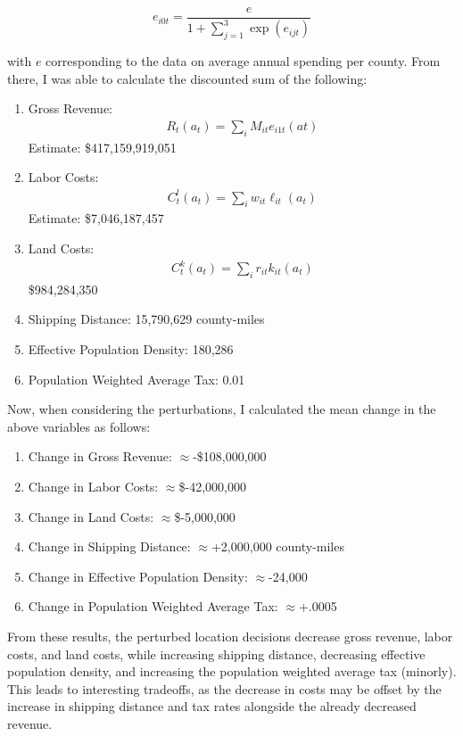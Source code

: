 \documentclass[11pt]{article}
\theoremstyle{definition}
\theoremstyle{remark}
\begin{document}
\begin{equation}
  e_{i0t} = \frac{e}{1 + \sum_{j=1}^3 \exp(e_{ijt})}
\end{equation}

with $e$ corresponding to the data on average annual spending per county. From there, I was able to calculate the discounted sum of the following:

\begin{enumerate}
  \item Gross Revenue: 
  \begin{gather*}
    R_t(a_t) = \sum_iM_{it}e_{i1t}(at)
  \end{gather*}
  Estimate: \$417,159,919,051
  \item Labor Costs:
  \begin{gather*}
    C^l_t(a_t) = \sum_iw_{it}\ell_{it}(a_t)
  \end{gather*}
  Estimate: \$7,046,187,457
  \item Land Costs:
  \begin{gather*}
    C^k_t(a_t) = \sum_i r_{it} k_{it}(a_t)
  \end{gather*}
  \$984,284,350
  \item Shipping Distance: 15,790,629 county-miles
  \item Effective Population Density: 180,286 
  \item Population Weighted Average Tax: 0.01
\end{enumerate}

Now, when considering the perturbations, I calculated the mean change in the above variables as follows:

\begin{enumerate}
  \item Change in Gross Revenue: $\approx$-\$108,000,000
  \item Change in Labor Costs: $\approx$\$-42,000,000
  \item Change in Land Costs: $\approx$\$-5,000,000
  \item Change in Shipping Distance: $\approx$+2,000,000 county-miles
  \item Change in Effective Population Density: $\approx$-24,000
  \item Change in Population Weighted Average Tax: $\approx$+.0005
\end{enumerate}

From these results, the perturbed location decisions decrease gross revenue, labor costs, and land costs, while increasing shipping distance, decreasing effective population density, and increasing the population weighted average tax (minorly). This leads to interesting tradeoffs, as the decrease in costs may be offset by the increase in shipping distance and tax rates alongside the already decreased revenue.
\end{document}
